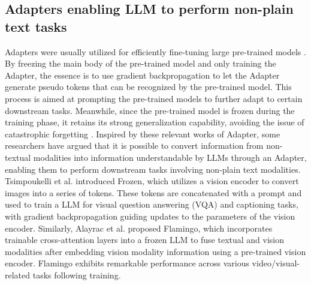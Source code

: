 	
	\subsection{Adapters enabling LLM to perform non-plain text tasks}
	Adapters were usually utilized for efficiently fine-tuning large pre-trained models \cite{houlsby2019parameter, pfeiffer2020adapterhub, he2022sparseadapter, hu2023llm}. By freezing the main body of the pre-trained model and only training the Adapter, the essence is to use gradient backpropagation to let the Adapter generate pseudo tokens that can be recognized by the pre-trained model. This process is aimed at prompting the pre-trained models to further adapt to certain downstream tasks. Meanwhile, since the pre-trained model is frozen during the training phase, it retains its strong generalization capability, avoiding the issue of catastrophic forgetting \cite{liu2021p, liu2023gpt}. Inspired by these relevant works of Adapter, some researchers have argued that it is possible to convert information from non-textual modalities into information understandable by LLMs through an Adapter, enabling them to perform downstream tasks involving non-plain text modalities.
	Tsimpoukelli et al.  introduced Frozen, which utilizes a vision encoder to convert images into a series of tokens. These tokens are concatenated with a prompt and used to train a LLM for visual question answering (VQA) and captioning tasks, with gradient backpropagation guiding updates to the parameters of the vision encoder.
	Similarly, Alayrac et al.  proposed Flamingo, which incorporates trainable cross-attention layers into a frozen LLM to fuse textual and vision modalities after embedding vision modality information using a pre-trained vision encoder. Flamingo exhibits remarkable performance across various video/visual-related tasks following training. 
